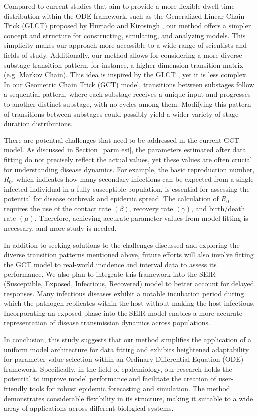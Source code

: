 \documentclass[12pt]{article}
\newcommand{\sref}[1]{Section~\ref{#1}}
\begin{document}
Compared to current studies that aim to provide a more flexible dwell time distribution within the ODE framework, such as the Generalized Linear Chain Trick (GLCT) proposed by Hurtado and Kirosingh \cite{hurtado2019generalizations}, our method offers a simpler concept and structure for constructing, simulating, and analyzing models. This simplicity makes our approach more accessible to a wide range of scientists and fields of study. Additionally, our method allows for considering a more diverse substage transition pattern, for instance, a higher dimension transition matrix (e.g. Markov Chain). This idea is inspired by the GLCT \cite{hurtado2019generalizations}\cite{hurtado2021building}, yet it is less complex. In our Geometric Chain Trick (GCT) model, transitions between substages follow a sequential pattern, where each substage receives a unique input and progresses to another distinct substage, with no cycles among them. Modifying this pattern of transitions between substages could possibly yield a wider variety of stage duration distributions.

There are potential challenges that need to be addressed in the current GCT model. As discussed in \sref{parm est}, the parameters estimated after data fitting do not precisely reflect the actual values, yet these values are often crucial for understanding disease dynamics. For example, the basic reproduction number, $R_0$, which indicates how many secondary infections can be expected from a single infected individual in a fully susceptible population, is essential for assessing the potential for disease outbreak and epidemic spread. The calculation of $R_0$ requires the use of the contact rate $(\beta)$, recovery rate $(\gamma)$, and birth/death rate $(\mu)$. Therefore, achieving accurate parameter values from model fitting is necessary, and more study is needed.

In addition to seeking solutions to the challenges discussed and exploring the diverse transition patterns mentioned above, future efforts will also involve fitting the GCT model to real-world incidence and interval data to assess its performance. We also plan to integrate this framework into the SEIR (Susceptible, Exposed, Infectious, Recovered) model to better account for delayed responses. Many infectious diseases exhibit a notable incubation period during which the pathogen replicates within the host without making the host infectious. Incorporating an exposed phase into the SEIR model enables a more accurate representation of disease transmission dynamics across populations.

In conclusion, this study suggests that our method simplifies the application of a uniform model architecture for data fitting and exhibits heightened adaptability for parameter value selection within an Ordinary Differential Equation (ODE) framework. Specifically, in the field of epidemiology, our research holds the potential to improve model performance and facilitate the creation of user-friendly tools for robust epidemic forecasting and simulation. The method demonstrates considerable flexibility in its structure, making it suitable to a wide array of applications across different biological systems. 


 
\end{document}

